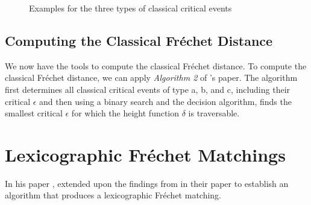 \begin{figure}[H]
    \centering
    
    \qquad
    \qquad

	\caption{Examples for the three types of classical critical events}
    \label{fig:classical_critical_events}
\end{figure}

\addtocounter{footnote}{-3} %

\subsection{Computing the Classical Fréchet Distance}

We now have the tools to compute the classical Fréchet distance. To compute the classical Fréchet distance, we can apply \textit{Algorithm 2} of \citeauthor*{altgodau}'s paper.\cite{altgodau} The algorithm first determines all classical critical events of type a, b, and c, including their critical $\epsilon$ and then using a binary search and the decision algorithm, finds the smallest critical $\epsilon$ for which the height function $\delta$ is traversable.


\section{Lexicographic Fréchet Matchings}

In his \citeyear{rotelex} paper , \citeauthor{rotelex} extended upon the findings from \citeauthor*{altgodau} in their paper  to establish an algorithm that produces a lexicographic Fréchet matching.

